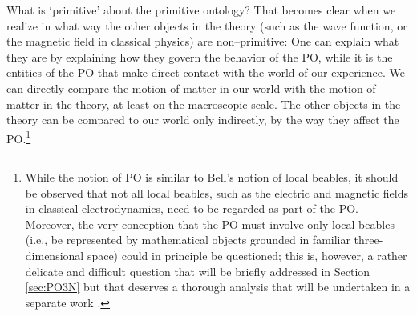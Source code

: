 \documentclass[12pt]{article}
\begin{document}
What is `primitive' about the primitive ontology? That becomes clear when we realize in what way the other objects in the theory (such as the wave function, or the magnetic field in classical physics) are non--primitive: One can explain what they are by explaining how they govern the behavior of the PO, while it is the entities of the PO that make direct contact with the world of our experience. We can directly compare the motion of matter in our world with the motion of matter in the theory, at least on the macroscopic scale. The other objects in the theory can be compared to our world only indirectly, by the way they affect the PO.\footnote{While the notion of PO is similar to Bell's notion of local
beables, it should be observed that not all local beables, such as the
electric and magnetic fields in classical electrodynamics, need to be regarded as part
of the PO. Moreover, the very
conception that the PO must involve only local beables (i.e., be represented by 
mathematical objects grounded in familiar three-dimensional space)
could in principle be questioned; this is, however, a rather delicate and
difficult question that will be briefly addressed in Section \ref{sec:PO3N}
 but that deserves a thorough analysis that will be undertaken
in a separate work \citep{semicolon}.} %
 
\end{document}
